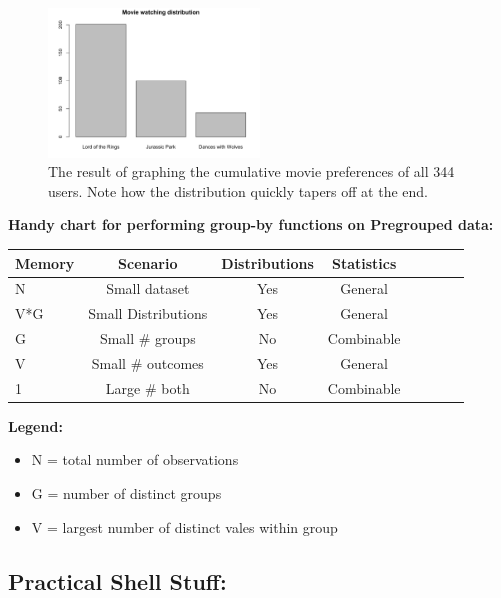 \begin{figure}[ht]
  \begin{center}
    \includegraphics[width=0.5\textwidth]{figures/MovieDistribution.png}
    \caption{
      The result of graphing the cumulative movie preferences of all 344 users. Note how the distribution quickly tapers off at the end.}
    \label{fig:MovieDistribution}
  \end{center}
\end{figure}





\pagebreak
\textbf{Handy chart for performing group-by functions on Pregrouped data:}

\begin{tabular}{l*{6}{c}r}
Memory        & Scenario & Distributions & Statistics \\
\hline
N & Small dataset & Yes & General   \\
V*G   & Small Distributions &  Yes & General \\
G     & Small \# groups & No & Combinable   \\
V     & Small \# outcomes & Yes & General   \\
1     & Large \# both & No & Combinable   \\
\end{tabular}

\textbf{Legend:}
\begin{itemize}
	\item N = total number of observations
    \item G = number of distinct groups
    \item V = largest number of distinct vales within group
\end{itemize}

\subsection{Practical Shell Stuff:}

